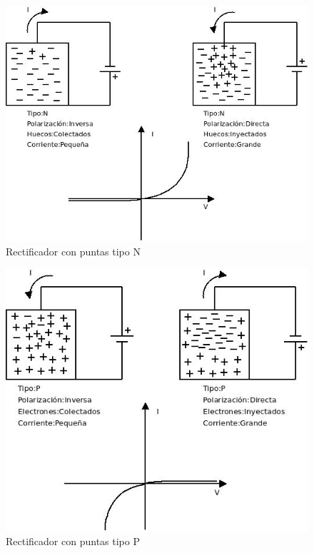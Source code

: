 \documentclass[oneside]{book}
\numberwithin{equation}{section}
\numberwithin{figure}{section}
\numberwithin{table}{section}
\begin{document}
				\begin{minipage}[t]{0.4\textwidth}
					\begin{figure}[H]
						\begin{center}
							\includegraphics[scale=0.35]{Rectificador-N.jpeg}
							\caption{Rectificador con puntas tipo N}
						\end{center}
					\end{figure}		
				\end{minipage}
				\begin{minipage}[t]{0.4\textwidth}
					\begin{figure}[H]
						\begin{center}
							\includegraphics[scale=0.35]{Rectificador-P.jpeg}
							\caption{Rectificador con puntas tipo P}
						\end{center}
					\end{figure}		
				\end{minipage}
				
\end{document}
